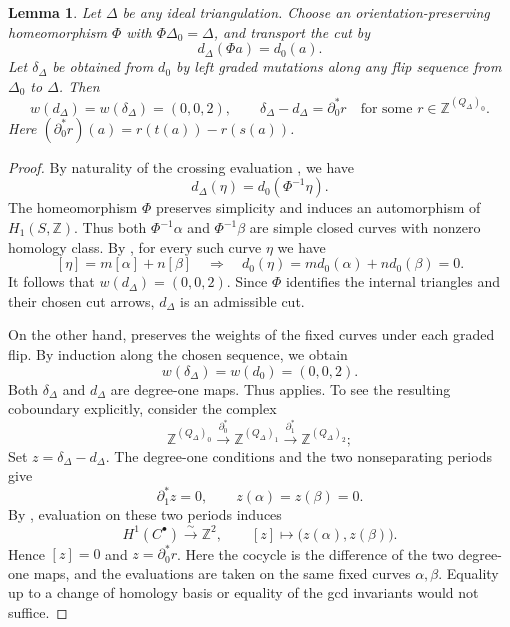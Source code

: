 \documentclass[12pt,a4paper,english,reqno]{amsart}
\theoremstyle{plain}
\newtheorem{lem}[thm]{Lemma}
\theoremstyle{definition}
\numberwithin{equation}{section}
\def\al{\alpha}
\def\be{\beta}
\def\de{\delta}
\def\et{\eta}
\def\De{\Delta}
\def\Ph{\Phi}
\def\bbZ{{\mathbb Z}}
\def\ya#1{\xrightarrow{#1}}
\begin{document}
\begin{lem}\label{lem:torus-marked-weights}
Let $\De$ be any ideal triangulation. Choose an orientation-preserving homeomorphism $\Ph$ with $\Ph\De_0=\De$, and transport the cut by
\[
 d_\De(\Ph a)=d_0(a).
\]
Let $\de_\De$ be obtained from $d_0$ by left graded mutations along any flip sequence from $\De_0$ to $\De$. Then
\[
 w(d_\De)=w(\de_\De)=(0,0,2),\qquad
 \de_\De-d_\De=\partial_0^*r
 \quad\text{for some }r\in\bbZ^{(Q_\De)_0}.
\]
Here $(\partial_0^*r)(a)=r(t(a))-r(s(a))$.
\end{lem}
\begin{proof}
By naturality of the crossing evaluation \cite[Lemma 2.6]{AGSurface}, we have
\[
 d_\De(\et)=d_0(\Ph^{-1}\et).
\]
The homeomorphism $\Ph$ preserves simplicity and induces an automorphism of $H_1(S,\bbZ)$. Thus both $\Ph^{-1}\al$ and $\Ph^{-1}\be$ are simple closed curves with nonzero homology class. By \cite[Proposition 3.11]{AmiotTorus}, for every such curve $\et$ we have
\[
 [\et]=m[\al]+n[\be]\quad\Longrightarrow\quad
 d_0(\et)=m d_0(\al)+n d_0(\be)=0.
\]
It follows that $w(d_\De)=(0,0,2)$. Since $\Ph$ identifies the internal triangles and their chosen cut arrows, $d_\De$ is an admissible cut.

On the other hand, \cite[Lemma 2.14]{AGSurface} preserves the weights of the fixed curves under each graded flip. By induction along the chosen sequence, we obtain
\[
 w(\de_\De)=w(d_0)=(0,0,2).
\]
Both $\de_\De$ and $d_\De$ are degree-one maps. Thus \cite[Corollary 2.11]{AGSurface} applies. To see the resulting coboundary explicitly, consider the complex
\[
 \bbZ^{(Q_\De)_0}\ya{\partial_0^*}
 \bbZ^{(Q_\De)_1}\ya{\partial_1^*}
 \bbZ^{(Q_\De)_2};
\]
Set $z=\de_\De-d_\De$. The degree-one conditions and the two nonseparating periods give
\[
 \partial_1^*z=0,\qquad z(\al)=z(\be)=0.
\]
By \cite[Remark 2.7]{AGSurface}, evaluation on these two periods induces
\[
 H^1(C^\bullet)\ya{\sim}\bbZ^2,
 \qquad [z]\longmapsto\bigl(z(\al),z(\be)\bigr).
\]
Hence $[z]=0$ and $z=\partial_0^*r$. Here the cocycle is the difference of the two degree-one maps, and the evaluations are taken on the same fixed curves $\al,\be$. Equality up to a change of homology basis or equality of the gcd invariants would not suffice.
\end{proof}
\end{document}
